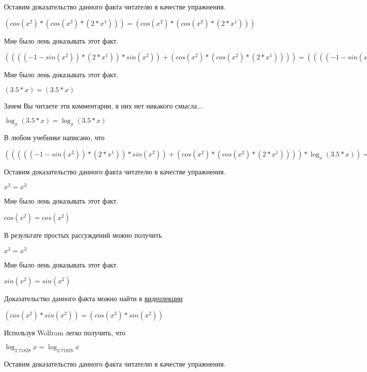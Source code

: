 \documentclass[12pt,a4paper,fleqn]{article}
\theoremstyle{definition}
\begin{document}
Оставим доказательство данного факта читателю в качестве упражнения.

$(cos({ x }^{ 2 }) * (cos({ x }^{ 2 }) * ( 2  * { x }^{ 1 }))) = (cos({ x }^{ 2 }) * (cos({ x }^{ 2 }) * ( 2  * { x }^{ 1 })))$

Мне было лень доказывать этот факт.

$(((( -1  - sin({ x }^{ 2 })) * ( 2  * { x }^{ 1 })) * sin({ x }^{ 2 })) + (cos({ x }^{ 2 }) * (cos({ x }^{ 2 }) * ( 2  * { x }^{ 1 })))) = (((( -1  - sin({ x }^{ 2 })) * ( 2  * { x }^{ 1 })) * sin({ x }^{ 2 })) + (cos({ x }^{ 2 }) * (cos({ x }^{ 2 }) * ( 2  * { x }^{ 1 }))))$

Мне было лень доказывать этот факт.

$( 3.5  *  x ) = ( 3.5  *  x )$

Зачем Вы читаете эти комментарии, в них нет никакого смысла...

$\log_{ x }{( 3.5  *  x )} = \log_{ x }{( 3.5  *  x )}$

В любом учебнике написано, что

$((((( -1  - sin({ x }^{ 2 })) * ( 2  * { x }^{ 1 })) * sin({ x }^{ 2 })) + (cos({ x }^{ 2 }) * (cos({ x }^{ 2 }) * ( 2  * { x }^{ 1 })))) * \log_{ x }{( 3.5  *  x )}) = ((((( -1  - sin({ x }^{ 2 })) * ( 2  * { x }^{ 1 })) * sin({ x }^{ 2 })) + (cos({ x }^{ 2 }) * (cos({ x }^{ 2 }) * ( 2  * { x }^{ 1 })))) * \log_{ x }{( 3.5  *  x )})$

Оставим доказательство данного факта читателю в качестве упражнения.

${ x }^{ 2 } = { x }^{ 2 }$

Мне было лень доказывать этот факт.

$cos({ x }^{ 2 }) = cos({ x }^{ 2 })$

В результате простых рассуждений можно получить

${ x }^{ 2 } = { x }^{ 2 }$

Мне было лень доказывать этот факт.

$sin({ x }^{ 2 }) = sin({ x }^{ 2 })$

Доказательство данного факта можно найти в \href{https://www.youtube.com/watch?v=dQw4w9WgXcQ}{видеолекции}

$(cos({ x }^{ 2 }) * sin({ x }^{ 2 })) = (cos({ x }^{ 2 }) * sin({ x }^{ 2 }))$

Используя Wolfram легко получить, что

$\log_{ 2.71828 }{ x } = \log_{ 2.71828 }{ x }$

Оставим доказательство данного факта читателю в качестве упражнения.
\end{document}
